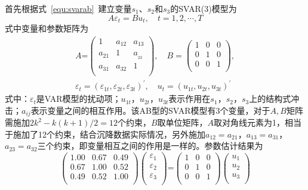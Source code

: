 首先根据式~\ref{equ:svarab}~建立变量$s_1$、$s_2$和$s_3$的SVAR(3)模型为
\begin{equation}
	A{{\varepsilon }_{t}}=B{{u}_{t}},\quad t=1,2,\cdots ,T \nonumber
\end{equation}
式中变量和参数矩阵为
\begin{gather}
  A\text{=}\left( \begin{matrix}
   1 & {{a}_{12}} & {{a}_{13}}  \\
   {{a}_{21}} & 1 & a{}_{_{23}}  \\
   {{a}_{31}} & {{a}_{32}} & 1  \\
\end{matrix} \right),\quad B=\left( \begin{matrix}
   1 & 0 & 0  \\
   0 & 1 & 0  \\
   0 & 0 & 1  \\
\end{matrix} \right), \nonumber \\ 
 {{\varepsilon }_{t}}={{\left( {{\varepsilon }_{1t}},{{\varepsilon }_{2t}},{{\varepsilon }_{3t}} \right)}^{\prime }},\quad {{u}_{t}}={{\left( {{u}_{1t}},{{u}_{2t}},{{u}_{3t}} \right)}^{\prime }} \nonumber 
\end{gather}
式中：$\varepsilon _t$是VAR模型的扰动项；${u}_{1t}$，${u}_{2t}$，${u}_{3t}$表示作用在$s_1$，$s_2$，$s_3$上的结构式冲击；$a_{ij}$表示变量之间的相互作用。该AB型的SVAR模型有3个变量，对于$A,B$矩阵需施加$2k^2-k(k+1)/2=12$个约束，$B$取单位矩阵，$A$取对角线元素为1，相当于施加了12个约束，结合沉降数据实际情况，另外施加$a_{12}=a_{21}$，$a_{13}=a_{31}$，$a_{23}=a_{32}$三个约束，即变量相互之间的作用是一样的。参数估计结果为
\begin{equation}
	\left( \begin{matrix}
   1.00 & 0.67 & 0.49  \\
   0.67 & 1.00 & 0.52  \\
   0.49 & 0.52 & 1.00  \\
\end{matrix} \right)\left( \begin{matrix}
   {{\varepsilon }_{1}}  \\
   {{\varepsilon }_{2}}  \\
   {{\varepsilon }_{3}}  \\
\end{matrix} \right)\text{=}\left( \begin{matrix}
   1 & 0 & 0  \\
   0 & 1 & 0  \\
   0 & 0 & 1  \\
\end{matrix} \right)\left( \begin{matrix}
   {{u}_{1}}  \\
   {{u}_{2}}  \\
   {{u}_{3}}  \\
\end{matrix} \right) \nonumber
\end{equation}

